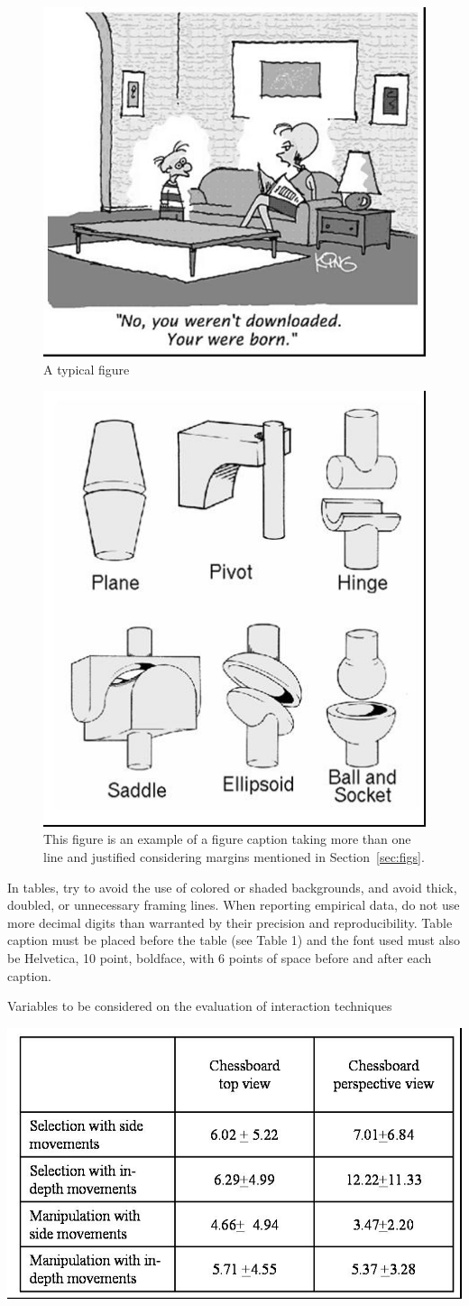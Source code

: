 \documentclass[12pt]{article}
\begin{document}
\begin{figure}[ht]
\centering
\includegraphics[width=.5\textwidth]{fig1.jpg}
\caption{A typical figure}
\label{fig:exampleFig1}
\end{figure}

\begin{figure}[ht]
\centering
\includegraphics[width=.3\textwidth]{fig2.jpg}
\caption{This figure is an example of a figure caption taking more than one
  line and justified considering margins mentioned in Section~\ref{sec:figs}.}
\label{fig:exampleFig2}
\end{figure}

In tables, try to avoid the use of colored or shaded backgrounds, and avoid
thick, doubled, or unnecessary framing lines. When reporting empirical data,
do not use more decimal digits than warranted by their precision and
reproducibility. Table caption must be placed before the table (see Table 1)
and the font used must also be Helvetica, 10 point, boldface, with 6 points of
space before and after each caption.

\begin{table}[ht]
\centering
\caption{Variables to be considered on the evaluation of interaction
  techniques}
\label{tab:exTable1}
\includegraphics[width=.7\textwidth]{table.jpg}
\end{table}
\end{document}
